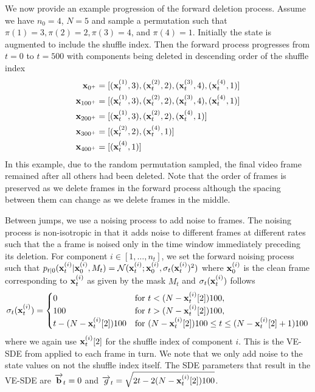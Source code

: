 We now provide an example progression of the forward deletion process. Assume we have $n_0=4$, $N=5$ and sample a permutation such that $\pi(1)=3, \pi(2)=2, \pi(3)=4$, and $\pi(4)=1$. Initially the state is augmented to include the shuffle index. Then the forward process progresses from $t=0$ to $t=500$ with components being deleted in descending order of the shuffle index
\begin{align}
    {\mathbf{x}}_{0^+}&=[({\mathbf{x}}^{(1)}_{t}, 3), ({\mathbf{x}}^{(2)}_{t}, 2), ({\mathbf{x}}^{(3)}_{t}, 4), ({\mathbf{x}}^{(4)}_{t}, 1)]\\
    {\mathbf{x}}_{100^+} &= [({\mathbf{x}}^{(1)}_{t}, 3), ({\mathbf{x}}^{(2)}_{t}, 2), ({\mathbf{x}}^{(3)}_{t}, 4), ({\mathbf{x}}^{(4)}_{t}, 1)]\\
    {\mathbf{x}}_{200^+} &= [({\mathbf{x}}^{(1)}_{t}, 3), ({\mathbf{x}}^{(2)}_{t}, 2), ({\mathbf{x}}^{(4)}_{t}, 1)]\\
    {\mathbf{x}}_{300^+} &= [({\mathbf{x}}^{(2)}_{t}, 2), ({\mathbf{x}}^{(4)}_{t}, 1)]\\
    {\mathbf{x}}_{400^+} &= [({\mathbf{x}}^{(4)}_{t}, 1)]\\
\end{align}
In this example, due to the random permutation sampled, the final video frame remained after all others had been deleted. Note that the order of frames is preserved as we delete frames in the forward process although the spacing between them can change as we delete frames in the middle.


Between jumps, we use a noising process to add noise to frames. The noising process is non-isotropic in that it adds noise to different frames at different rates such that the a frame is noised only in the time window immediately preceding its deletion. For component $i \in [1, \dots, n_t]$, we set the forward noising process such that $p_{t|0}({\mathbf{x}}_t^{(i)} | {\mathbf{x}}_0^{(i)}, M_t) = \mathcal{N}({\mathbf{x}}_t^{(i)}; {\mathbf{x}}_0^{(i)}, \sigma_t({\mathbf{x}}_t^{(i)})^2)$ where ${\mathbf{x}}_0^{(i)}$ is the clean frame corresponding to ${\mathbf{x}}_t^{(i)}$ as given by the mask $M_t$ and $\sigma_t({\mathbf{x}}_t^{(i)})$ follows
\begin{equation}
    \sigma_t({\mathbf{x}}_t^{(i)}) = \begin{cases}
        0 & \text{for } t < (N - {\mathbf{x}}_t^{(i)}[2]) 100,\\
        100 & \text{for } t > (N - {\mathbf{x}}_t^{(i)}[2]) 100,\\
        t - (N - {\mathbf{x}}_t^{(i)}[2])100 & \text{for } (N - {\mathbf{x}}_t^{(i)}[2])100 \leq t \leq (N - {\mathbf{x}}_t^{(i)}[2]+1) 100
    \end{cases}
\end{equation}
where we again use ${\mathbf{x}}_t^{(i)}[2]$ for the shuffle index of component $i$. This is the VE-SDE from \cite{song2020score} applied to each frame in turn. We note that we only add noise to the state values on not the shuffle index itself. The SDE parameters that result in the VE-SDE are $\overrightarrow{\mathbf{b}}_t = 0$ and $\overrightarrow{g}_t = \sqrt{2t - 2(N - {\mathbf{x}}_t^{(i)}[2])100}$.



